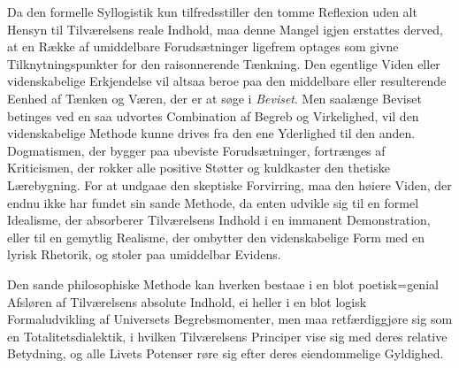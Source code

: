 \documentclass[12pt]{book}
\newcommand{\parag}[2]{%
  \par\vspace{0.9\baselineskip}%
  \begin{center}
    {\bfseries \S\,#1.\par}\vspace{0.2\baselineskip}
    {\bfseries #2\par}
  \end{center}
  \vspace{0.25\baselineskip}
  \phantomsection
  \addcontentsline{toc}{subsubsection}{\texorpdfstring{\S\,#1.\quad #2}{§ #1. #2}}%
}
\newcommand{\opage}[1]{\marginnote{\footnotesize\textit{[#1]}}}
\begin{document}
Da den formelle Syllogistik kun tilfredsstiller den tomme Reflexion uden alt Hensyn
til Tilværelsens reale Indhold, maa denne Mangel igjen erstattes derved, at en Række
af umiddelbare Forudsætninger ligefrem optages som givne Tilknytningspunkter for den
raisonnerende Tænkning. Den egentlige Viden eller videnskabelige Erkjendelse vil
altsaa beroe paa den middelbare eller resulterende Eenhed af Tænken og Væren, der er
at
\opage{89} %
søge i \emph{Beviset}. Men saalænge Beviset betinges ved en saa udvortes
Combination af Begreb og Virkelighed, vil den videnskabelige Methode kunne drives
fra den ene Yderlighed til den anden. Dogmatismen, der bygger paa ubeviste
Forudsætninger, fortrænges af Kriticismen, der rokker alle positive Støtter og
kuldkaster den thetiske Lærebygning. For at undgaae den skeptiske Forvirring, maa
den høiere Viden, der endnu ikke har fundet sin sande Methode, da enten udvikle sig
til en formel Idealisme, der absorberer Tilværelsens Indhold i en immanent
Demonstration, eller til en gemytlig Realisme, der ombytter den videnskabelige Form
med en lyrisk Rhetorik, og stoler paa umiddelbar Evidens.

Den sande philosophiske Methode kan hverken bestaae i en blot poetisk=genial
Afsløren af Tilværelsens absolute Indhold, ei heller i en blot logisk
Formaludvikling af Universets Begrebsmomenter, men maa retfærdiggjøre sig som en
Totalitetsdialektik, i hvilken Tilværelsens Principer vise sig med deres relative
Betydning, og alle Livets Potenser røre sig efter deres eiendommelige Gyldighed.
\end{document}
